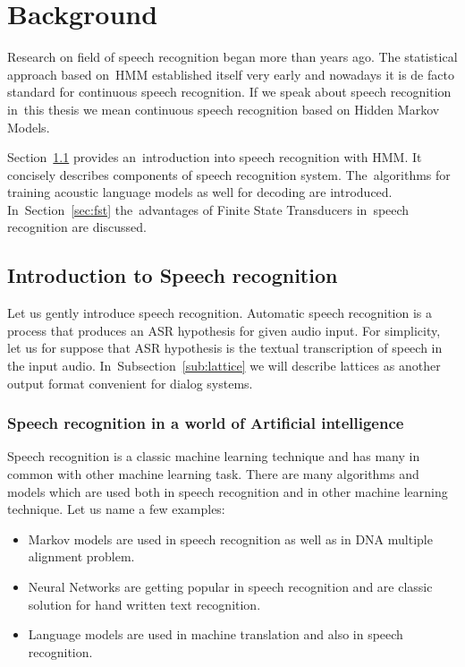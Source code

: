 \chapter{Background}
\label{cha:background}

% 
% 

Research on field of speech recognition began more than  years ago. The statistical approach based 
on~\ac{HMM} established itself very early and nowadays it is de facto standard for continuous speech recognition. 
If we speak about speech recognition in~this thesis we mean continuous speech recognition based on Hidden Markov Models. 

Section~\ref{sec:general_introduction} provides an~introduction into speech recognition with \ac{HMM}. 
It concisely describes components of speech recognition system. The~algorithms for training acoustic language models 
as well for decoding are introduced. In~Section~\ref{sec:fst} the~advantages of Finite State Transducers 
in~speech recognition are discussed.

\section{Introduction to Speech recognition} 
\label{sec:general_introduction}
Let us gently introduce speech recognition. Automatic speech recognition is a process
that produces an \ac{ASR} hypothesis for given audio input. 
For simplicity, let us for suppose that ASR hypothesis is the textual transcription of speech in the input audio. 
In~Subsection~\ref{sub:lattice} we will describe lattices as another output format convenient for dialog systems.

\subsection*{Speech recognition in a world of Artificial intelligence}
\label{sub:intro_ml}
Speech recognition is a classic machine learning technique and has many in common with other machine learning task. 
There are many algorithms and models which are used both in speech recognition and in other machine learning technique.
Let us name a few examples:
\begin{itemize}
    \item Markov models are used in speech recognition as well as in \ac{DNA} multiple alignment problem.
    \item Neural Networks are getting popular in speech recognition and are classic solution for hand written text recognition.
    \item Language models are used in machine translation and also in speech recognition. 
\end{itemize}


